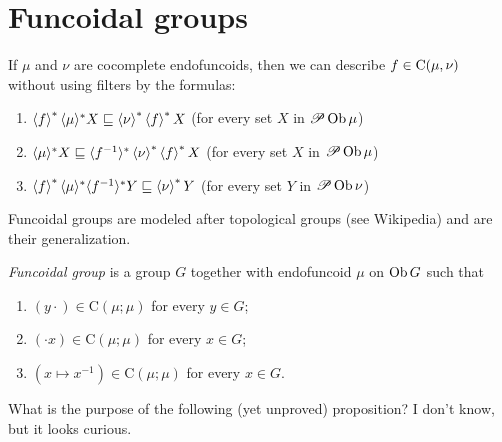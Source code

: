 \chapter{Funcoidal groups}

\begin{rem}
  If $\mu$ and $\nu$ are cocomplete endofuncoids, then we can describe $f \in
  \mathrm{C} (\mu,\nu)$ without using filters by the formulas:
  \begin{enumerate}
    \item $\left\langle f\right\rangle ^{\ast} \langle \mu \rangle^{\ast} X \sqsubseteq
    \left\langle \nu\right\rangle^{\ast} \left\langle f\right\rangle ^{\ast} X$ (for every set $X$
    in $\mathscr{P} \operatorname{Ob} \mu$)
    
    \item $\langle \mu \rangle^{\ast} X \sqsubseteq \langle f^{- 1}
    \rangle^{\ast} \left\langle \nu\right\rangle^{\ast} \left\langle f\right\rangle ^{\ast} X$ (for
    every set $X$ in $\mathscr{P} \operatorname{Ob} \mu$)
    
    \item $\left\langle f\right\rangle ^{\ast} \langle \mu \rangle^{\ast} \langle f^{- 1}
    \rangle^{\ast} Y \sqsubseteq \left\langle \nu\right\rangle^{\ast} Y$ (for every set
    $Y$ in $\mathscr{P} \operatorname{Ob} \nu$)
  \end{enumerate}
\end{rem}

Funcoidal groups are modeled after topological groups (see Wikipedia)
and are their generalization.

\begin{defn}
  \emph{Funcoidal group} is a group $G$ together with endofuncoid $\mu$ on
  $\operatorname{Ob} G$ such that
  \begin{enumerate}
    \item $(y \cdot) \in \mathrm{C} (\mu ; \mu)$ for every $y \in G$;
    
    \item $(\cdot x) \in \mathrm{C} (\mu ; \mu)$ for every $x \in G$;
    
    \item $(x \mapsto x^{- 1}) \in \mathrm{C} (\mu ; \mu)$ for every $x \in
    G$.
  \end{enumerate}
\end{defn}

What is the purpose of the following (yet unproved) proposition? I don't know, but it looks curious.


